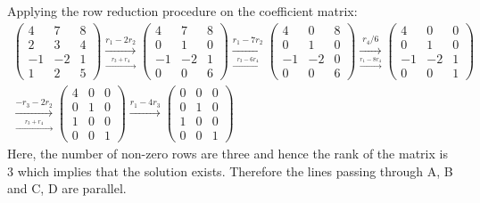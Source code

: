 \documentclass[a4paper,12pt]{article}
\begin{document}
\begin{flushleft}
Applying the row reduction procedure on the coefficient matrix:
\begin{align*}
\begin{pmatrix} 4 & 7 & 8\\ 2 & 3 & 4\\ -1 & -2 & 1\\ 1 & 2 & 5 \end{pmatrix}
\underset{\overset{r_3+r_4}{\longrightarrow}}{\overset{r_1 - 2r_2}{\longrightarrow}}
\begin{pmatrix} 4 & 7 & 8\\ 0 & 1 & 0\\ -1 & -2 & 1\\ 0 & 0 & 6 \end{pmatrix}
\underset{\overset{r_3-6r_4}{\longrightarrow}}{\overset{r_1 - 7r_2}{\longrightarrow}}
\begin{pmatrix} 4 & 0 & 8\\ 0 & 1 & 0\\ -1 & -2 & 0\\ 0 & 0 & 6 \end{pmatrix}
\underset{\overset{r_1-8r_4}{\longrightarrow}}{\overset{r_4/6}{\longrightarrow}}
\begin{pmatrix} 4 & 0 & 0\\ 0 & 1 & 0\\ -1 & -2 & 1\\ 0 & 0 & 1 \end{pmatrix} \\
\underset{\overset{r_3+r_4}{\longrightarrow}}{\overset{-r_3 - 2r_2}{\longrightarrow}}
\begin{pmatrix} 4 & 0 & 0\\ 0 & 1 & 0\\ 1 & 0 & 0\\ 0 & 0 & 1 \end{pmatrix}
{\overset{r_1 - 4r_3}{\longrightarrow}}
\begin{pmatrix} 0 & 0 & 0\\ 0 & 1 & 0\\ 1 & 0 & 0\\ 0 & 0 & 1 \end{pmatrix}
\end{align*}
Here, the number of non-zero rows are three and hence the rank of the matrix is 3 which implies that the solution exists. Therefore the lines passing through A, B and C, D are parallel.

\end{flushleft}
\end{document}
